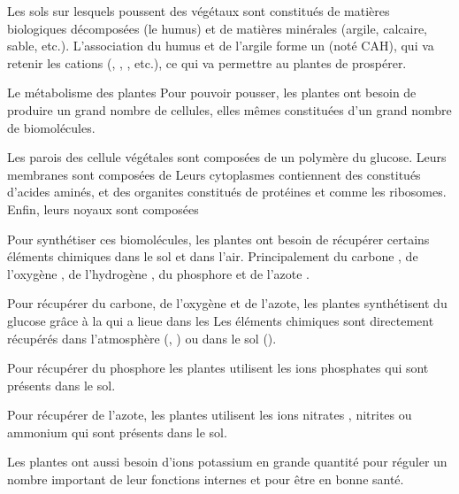 \tetePremStssAlim
\vspace*{-24pt}

\begin{contexte}
  Les sols sur lesquels poussent des végétaux sont constitués de matières biologiques décomposées (le humus) et de matières minérales (argile, calcaire, sable, etc.).
  L'association du humus et de l'argile forme un  (noté CAH), qui va retenir les cations (\ionPotassium, \ionSodium, \ammonium, etc.), ce qui va permettre au plantes de prospérer.

\end{contexte}

\begin{doc}{Le métabolisme des plantes}
  Pour pouvoir pousser, les plantes ont besoin de produire un grand nombre de cellules, elles mêmes constituées d'un grand nombre de biomolécules.

  \begin{importants}
    Les parois des cellule végétales sont composées de  un polymère du glucose.
    Leurs membranes sont composées de  
    Leurs cytoplasmes contiennent des  constitués d'acides aminés, et des organites constitués de protéines et  comme les ribosomes.
    Enfin, leurs noyaux sont composées 
  \end{importants}

  Pour synthétiser ces biomolécules, les plantes ont besoin de récupérer certains éléments chimiques dans le sol et dans l'air.
  Principalement du carbone \carbone, de l'oxygène \oxygene, de l'hydrogène \hydrogene, du phosphore \phosphore et de l'azote \azote.

  \begin{listePoints}
    \item Pour récupérer du carbone, de l'oxygène et de l'azote, les plantes synthétisent du glucose grâce à la  qui a lieue dans les 
    Les éléments chimiques sont directement récupérés dans l'atmosphère (\dioxydeDeCarbone, \eau) ou dans le sol (\eau).
  
    \item Pour récupérer du phosphore les plantes utilisent les ions phosphates \ionPhosphate qui sont présents dans le sol.
  
    \item Pour récupérer de l'azote, les plantes utilisent les ions nitrates \nitrate, nitrites \nitrite ou ammonium \ammonium qui sont présents dans le sol.
  \end{listePoints}
  Les plantes ont aussi besoin d'ions potassium \ionPotassium en grande quantité pour réguler un nombre important de leur fonctions internes et pour être en bonne santé.
\end{doc}

